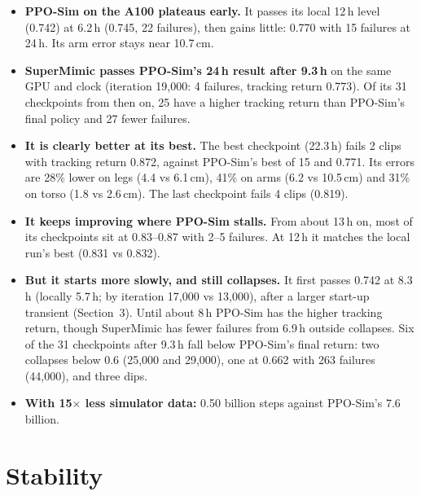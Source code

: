 \documentclass[10pt]{article}
\begin{document}
\begin{table}[H]
\centering\small
\caption{Best (highest tracking return) and last checkpoint of each run. Errors are root-relative
body-position errors averaged over each clip. Every cluster checkpoint is listed in the appendix.}
\label{tab:summary}
\setlength{\tabcolsep}{4pt}
\resizebox{\textwidth}{!}{}
\end{table}

\begin{itemize}
  \item \textbf{PPO-Sim on the A100 plateaus early.} It passes its local 12\,h level (0.742) at 6.2\,h
  (0.745, 22 failures), then gains little: 0.770 with 15 failures at 24\,h. Its
  arm error stays near 10.7\,cm.
  \item \textbf{SuperMimic passes PPO-Sim's 24\,h result after 9.3\,h} on the same GPU and clock
  (iteration 19,000: 4 failures, tracking return 0.773). Of its 31 checkpoints from then on, 25 have a
  higher tracking return than PPO-Sim's final policy and 27 fewer failures.
  \item \textbf{It is clearly better at its best.} The best checkpoint (22.3\,h) fails 2 clips with
  tracking return 0.872, against PPO-Sim's best of 15 and 0.771. Its errors are 28\% lower on legs
  (4.4 vs 6.1\,cm), 41\% on arms (6.2 vs 10.5\,cm) and 31\% on torso (1.8 vs 2.6\,cm). The last
  checkpoint fails 4 clips (0.819).
  \item \textbf{It keeps improving where PPO-Sim stalls.} From about 13\,h on, most of its checkpoints
  sit at 0.83--0.87 with 2--5 failures. At 12\,h it matches the local run's best
  (0.831 vs 0.832).
  \item \textbf{But it starts more slowly, and still collapses.} It first passes 0.742 at 8.3\,h
  (locally 5.7\,h; by iteration 17,000 vs 13,000), after a larger start-up transient (Section~3). Until
  about 8\,h PPO-Sim has the higher tracking return, though SuperMimic has fewer failures from 6.9\,h
  outside collapses.
  Six of the 31 checkpoints after 9.3\,h fall below PPO-Sim's final return: two collapses below 0.6
  (25,000 and 29,000), one at 0.662 with 263 failures (44,000), and three dips.
  \item \textbf{With 15$\times$ less simulator data:} 0.50 billion steps against PPO-Sim's 7.6 billion.
\end{itemize}

\section{Stability}
\end{document}

